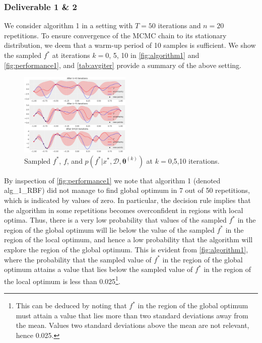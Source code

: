\subsubsection*{Deliverable 1 \& 2}
We consider algorithm 1 in a setting with $T=50$ iterations and $n=20$ repetitions. To ensure convergence of the MCMC chain to its stationary distribution, we deem that a warm-up period of 10 samples is sufficient. We show the sampled $f^*$ at iterations $k=$0, 5, 10 in \autoref{fig:algorithm1} and \autoref{fig:performance1}, and \autoref{tab:avgiter} provide a summary of the above setting.

\begin{figure}[H]
    \centering
    \includegraphics[width=0.475\textwidth]{src/algorithm1plot.png}
    \caption{Sampled $f^*$, $f$, and  $p(f^*|x^*,\mathcal{D}, \bm{\theta}^{(k)})$ at $k=$0,5,10 iterations.}
    \label{fig:algorithm1}
\end{figure}
By inspection of \autoref{fig:performance1} we note that algorithm 1 (denoted alg\_1\_RBF) did not manage to find global optimum in 7 out of 50 repetitions, which is indicated by values of zero. In particular, the decision rule implies that the algorithm in some repetitions becomes overconfident in regions with local optima. Thus, there is a very low probability that values of the sampled $f^*$ in the region of the global optimum will lie below the value of the sampled $f^*$ in the region of the local optimum, and hence a low probability that the algorithm will explore the region of the global optimum. This is evident from \autoref{fig:algorithm1}, where the probability that the sampled value of $f^*$ in the region of the global optimum attains a value that lies below the sampled value of $f^*$ in the region of the local optimum is less than 0.025\footnote{This can be deduced by noting that $f^*$ in the region of the global optimum must attain a value that lies more than two standard deviations away from the mean. Values two standard deviations above the mean are not relevant, hence 0.025.}.

